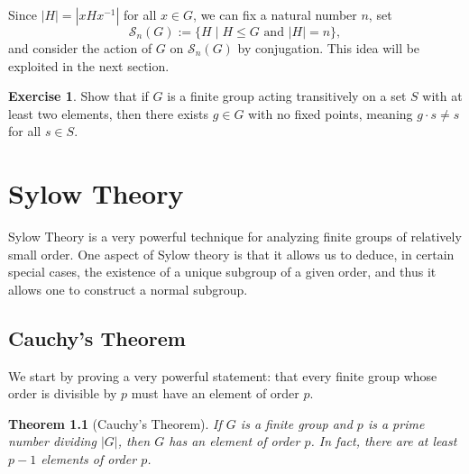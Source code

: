 \documentclass[12pt]{report}
\newtheorem{theorem}{Theorem}[chapter]
\numberwithin{equation}{section}
\numberwithin{theorem}{chapter}
\theoremstyle{definition}
\newtheorem{exercise}{Exercise}
\newtheorem*{basic properties}{Basic Properties}
\newtheorem*{Important Remark}{Important Remark}
\begin{document}
Since $|H| = |xHx^{-1}|$ for all $x \in G$, we can fix a natural number $n$, set
$$\mathcal{S}_n(G) := \{H \mid H \leq G  \text{ and } |H| = n\},$$ 
and consider the action of $G$ on $\mathcal{S}_n(G)$ by conjugation.
This idea will be exploited in the next section. 



\begin{exercise}
	Show that if $G$ is a finite group acting transitively on a set $S$ with at least two elements, then there exists $g \in G$ with no fixed points, meaning $g \cdot s \neq s$ for all $s \in S$.
\end{exercise}





\chapter{Sylow Theory}


Sylow Theory is a very powerful technique for analyzing finite groups of relatively small order. One aspect of Sylow theory is that it allows us to deduce, in certain special cases, the existence of a unique subgroup of a given order, and thus it allows one to construct a normal subgroup. 





\section{Cauchy's Theorem}

We start by proving a very powerful statement: that every finite group whose order is divisible by $p$ must have an element of order $p$.

\begin{theorem}[Cauchy's Theorem]\label{Cauchy's Theorem}\label{Cauchy's Theorem}
 If $G$ is a finite group and $p$ is a prime number dividing $|G|$, then $G$ has an element of order $p$. In fact, there are at least $p-1$ elements of order $p$.
 \end{theorem}
\end{document}
